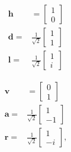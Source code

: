 	
	\begin{minipage}{0.5\textwidth}
	\begin{align*}
	\mathbf{h} &= \begin{bmatrix}1\\0\end{bmatrix} \\
	\mathbf{d} =& \frac{1}{\sqrt{2}}\begin{bmatrix}1\\1\end{bmatrix} \\
	\mathbf{l} =& \frac{1}{\sqrt{2}}\begin{bmatrix}1\\i\end{bmatrix} 
	\end{align*}
	\end{minipage}
	\begin{minipage}{0.5\textwidth}
	\begin{align*}
		\mathbf{v} &= \begin{bmatrix}0\\1\end{bmatrix}\\
		\mathbf{a} =& \frac{1}{\sqrt{2}}\begin{bmatrix}1\\-1\end{bmatrix}\\
		\mathbf{r} =& \frac{1}{\sqrt{2}}\begin{bmatrix}1\\-i\end{bmatrix},
	\end{align*}
	\end{minipage}
	\hfill

